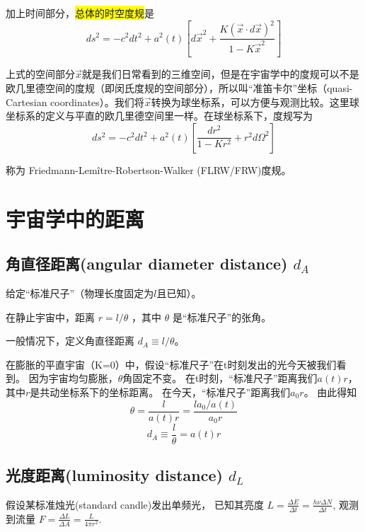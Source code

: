 \documentclass[]{ctexart}
\begin{document}
加上时间部分，\colorbox{yellow}{总体的时空度规}是 
\begin{equation}
    ds^2=-c^2dt^2 + a^2(t) \left[d\vec{x}^2 +  \frac{K(\vec{x} \cdot d\vec{x})^2}{1-K \vec{x}^2}\right]
\end{equation}

上式的空间部分$\vec{x}$就是我们日常看到的三维空间，但是在宇宙学中的度规可以不是欧几里德空间的度规（即闵氏度规的空间部分），所以叫“准笛卡尔”坐标（quasi-Cartesian coordinates）。我们将$\vec{x}$转换为球坐标系，可以方便与观测比较。这里球坐标系的定义与平直的欧几里德空间里一样。在球坐标系下，度规写为
\begin{equation}
    ds^2=-c^2dt^2 + a^2(t) \left[ \frac{dr^2}{1-Kr^2} + r^2 d\Omega^2 \right]
\end{equation}

称为 Friedmann-Lemître-Robertson-Walker (FLRW/FRW)度规。


\section{宇宙学中的距离}

\subsection{角直径距离(angular diameter distance) $d_A$ }

给定“标准尺子”（物理长度固定为$l$且已知）。

在静止宇宙中，距离 $r = l/\theta$ ，其中 $\theta$ 是“标准尺子”的张角。

一般情况下，定义角直径距离 $d_A \equiv l/\theta$。

在膨胀的平直宇宙（K=0）中，假设“标准尺子”在t时刻发出的光今天被我们看到。
因为宇宙均匀膨胀，$\theta$角固定不变。
在t时刻，“标准尺子”距离我们$a(t)r$，其中$r$是共动坐标系下的坐标距离。
在今天，“标准尺子”距离我们$a_0 r$。
由此得知
\begin{equation}
    \theta = \frac{l}{a(t)r} = \frac{l a_0/a(t)}{a_0 r}
\end{equation}
\begin{equation}
    d_A \equiv \frac{l}{\theta} = a(t)r
\end{equation}

\subsection{光度距离(luminosity distance) $d_L$ }

假设某标准烛光(standard candle)发出单频光，
已知其亮度 $L=\frac{\Delta E}{\Delta t} = \frac{h\nu \Delta N}{\Delta t}$,
观测到流量 $F=\frac{\Delta L}{\Delta A} = \frac{L}{4\pi r^2}$.
\end{document}
